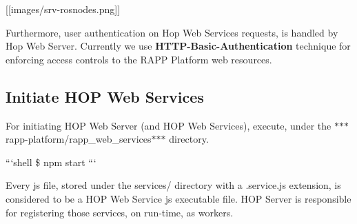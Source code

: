 \mbox{[}\mbox{[}images/srv-\/rosnodes.\-png\mbox{]}\mbox{]}

Furthermore, user authentication on Hop Web Services requests, is handled by Hop Web Server. Currently we use {\bfseries H\-T\-T\-P-\/\-Basic-\/\-Authentication} technique for enforcing access controls to the R\-A\-P\-P Platform web resources.

\subsection*{Initiate H\-O\-P Web Services}

For initiating H\-O\-P Web Server (and H\-O\-P Web Services), execute, under the $\ast$$\ast$$\ast$rapp-\/platform/rapp\-\_\-web\-\_\-services$\ast$$\ast$$\ast$ directory.

```shell \$ npm start ```

Every js file, stored under the services/ directory with a .service.\-js extension, is considered to be a H\-O\-P Web Service js executable file. H\-O\-P Server is responsible for registering those services, on run-\/time, as workers. 